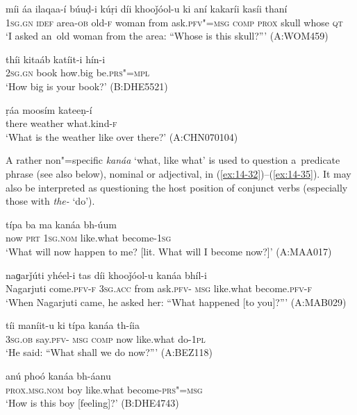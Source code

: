 \begin{exe}
\ex
\label{ex:14-29}
\gll míi áa ilaqaa-í búuḍ-i kúṛi díi khooǰóol-u  ki aní kakaríi kasíi thaní \\
\textsc{1sg.gn} \textsc{idef} area-\textsc{ob} old-\textsc{f} woman from ask.\textsc{pfv"=msg} \textsc{comp} \textsc{prox} skull whose \textsc{qt} \\
\glt `I asked an~old woman from the area: ``Whose is this skull?''' (A:WOM459)

\ex
\label{ex:14-30}
\gll thíi kitaáb katíit-i hín-i \\
\textsc{2sg.gn} book how.big be.\textsc{prs"=mpl} \\
\glt `How big is your book?' (B:DHE5521)

\ex
\label{ex:14-31}
\gll ṛáa moosím kateeṇ-í \\
there weather what.kind-\textsc{f} \\
\glt `What is the weather like over there?' (A:CHN070104)
\end{exe}

A rather non"=specific \textit{kanáa} `what, like what' is used to question a~predicate phrase (see also below), nominal or adjectival, in (\ref{ex:14-32})--(\ref{ex:14-35}). It may also be interpreted as questioning the host position of conjunct verbs (especially those with \textit{the-} `do'). 

\begin{exe}
\ex
\label{ex:14-32}
\gll típa ba ma kanáa bh-úum \\
now \textsc{prt} \textsc{1sg.nom} like.what become-\textsc{1sg} \\
\glt `What will now happen to me? [lit. What will I become now?]' (A:MAA017)

\ex
\label{ex:14-33}
\gll naɡarǰúti yhéel-i tas díi khooǰóol-u kanáa bhíl-i \\
Nagarjuti come.\textsc{pfv-f} \textsc{3sg.acc} from ask.\textsc{pfv- msg}  like.what become.\textsc{pfv-f} \\
\glt `When Nagarjuti came, he asked her: ``What happened [to you]?''' (A:MAB029)

\ex
\label{ex:14-34}
\gll tíi maníit-u ki típa kanáa th-íia \\
\textsc{3sg.ob} say.\textsc{pfv- msg} \textsc{comp} now like.what do-\textsc{1pl} \\
\glt `He said: ``What shall we do now?''' (A:BEZ118)

\ex
\label{ex:14-35}
\gll anú phoó kanáa bh-áanu \\
\textsc{prox.msg.nom} boy like.what become-\textsc{prs"=msg} \\
\glt `How is this boy [feeling]?' (B:DHE4743)
\end{exe}

